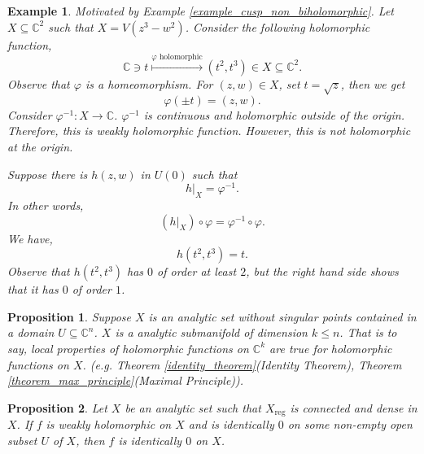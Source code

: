 \documentclass{article}
\newtheorem{proposition}{Proposition}[section]
\newtheorem{example}{Example}[section]
\DeclareMathOperator{\reg}{reg}
\newcommand{\C}[0]{\mathbb{C}}
\begin{document}
\begin{example}
  Motivated by Example \ref{example_cusp_non_biholomorphic}. Let $X\subseteq \C^2$ such that $X = V(z^3-w^2)$. Consider the following holomorphic function,
  \begin{equation*}
    \C\ni t\stackrel{\varphi\text{ holomorphic}}{\mapsto}(t^2,t^3)\in X\subseteq \C^2.
  \end{equation*}
  Observe that $\varphi$ is a homeomorphism. For $(z,w)\in X$, set $t=\sqrt{z}$, then we get 
  \begin{equation*}
    \varphi(\pm t) = (z,w).
  \end{equation*}
  Consider $\varphi^{-1}:X\to \C$. $\varphi^{-1}$ is continuous and holomorphic outside of the origin. Therefore, this is weakly holomorphic function.
  However, this is not holomorphic at the origin.
  \par Suppose there is $h(z,w)$ in $U(0)$ such that 
  \begin{equation*}
    h|_X = \varphi^{-1}.
  \end{equation*}
  In other words,
  \begin{equation*}
    (h|_X)\circ\varphi = \varphi^{-1}\circ\varphi.
  \end{equation*}
  We have,
  \begin{equation*}
    h(t^2,t^3) = t.
  \end{equation*}
  Observe that $h(t^2,t^3)$ has $0$ of order at least $2$, but the right hand side shows that it has $0$ of order $1$.
\end{example}

\begin{proposition}
  \label{proposition_4_1}
  Suppose $X$ is an analytic set without singular points contained in a domain $U\subseteq\C^n$.
  $X$ is a analytic submanifold of dimension $k\leq n$. That is to say, local properties of holomorphic functions on $\C^k$ are true for holomorphic functions on $X$.
  (e.g. Theorem \ref{identity_theorem}(Identity Theorem), Theorem \ref{theorem_max_principle}(Maximal Principle)).
\end{proposition}

\begin{proposition}
  \label{proposition_4_2}
  Let $X$ be an analytic set such that $X_{\reg}$ is connected and dense in $X$.
  If $f$ is weakly holomorphic on $X$ and is identically $0$ on some non-empty open subset $U$ of $X$, then $f$ is identically $0$ on $X$.
\end{proposition}
\end{document}
